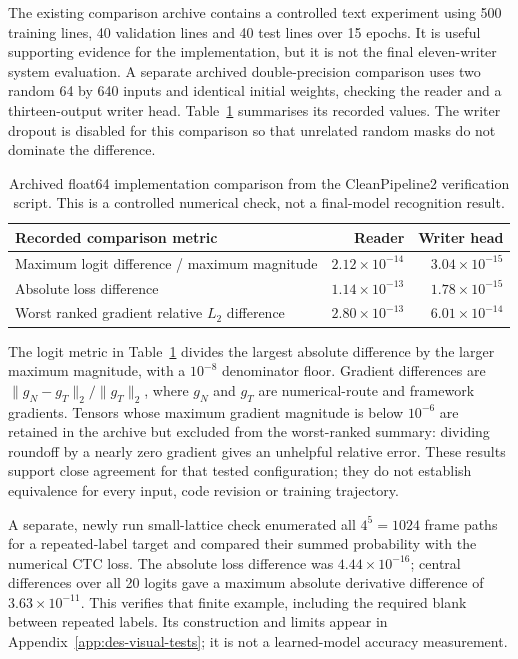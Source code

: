 The existing comparison archive contains a controlled text experiment using 500 training lines, 40 validation lines and 40 test lines over 15 epochs. It is useful supporting evidence for the implementation, but it is not the final eleven-writer system evaluation. A separate archived double-precision comparison uses two random 64 by 640 inputs and identical initial weights, checking the reader and a thirteen-output writer head. Table~\ref{tab:des-numericalcheck} summarises its recorded values. The writer dropout is disabled for this comparison so that unrelated random masks do not dominate the difference.
\begin{table}[H]\centering\small
\begin{tabularx}{\linewidth}{|X|r|r|}
\hline\textbf{Recorded comparison metric}&\textbf{Reader}&\textbf{Writer head}\\\hline
Maximum logit difference / maximum magnitude&$2.12\times10^{-14}$&$3.04\times10^{-15}$\\\hline
Absolute loss difference&$1.14\times10^{-13}$&$1.78\times10^{-15}$\\\hline
Worst ranked gradient relative $L_2$ difference&$2.80\times10^{-13}$&$6.01\times10^{-14}$\\\hline
\end{tabularx}
\caption{Archived float64 implementation comparison from the CleanPipeline2 verification script. This is a controlled numerical check, not a final-model recognition result.}
\label{tab:des-numericalcheck}
\end{table}
The logit metric in Table~\ref{tab:des-numericalcheck} divides the largest absolute difference by the larger maximum magnitude, with a $10^{-8}$ denominator floor. Gradient differences are $\|g_N-g_T\|_2/\|g_T\|_2$, where $g_N$ and $g_T$ are numerical-route and framework gradients. Tensors whose maximum gradient magnitude is below $10^{-6}$ are retained in the archive but excluded from the worst-ranked summary: dividing roundoff by a nearly zero gradient gives an unhelpful relative error. These results support close agreement for that tested configuration; they do not establish equivalence for every input, code revision or training trajectory.

A separate, newly run small-lattice check enumerated all $4^5=1024$ frame paths for a repeated-label target and compared their summed probability with the numerical CTC loss. The absolute loss difference was $4.44\times10^{-16}$; central differences over all 20 logits gave a maximum absolute derivative difference of $3.63\times10^{-11}$. This verifies that finite example, including the required blank between repeated labels. Its construction and limits appear in Appendix~\ref{app:des-visual-tests}; it is not a learned-model accuracy measurement.

